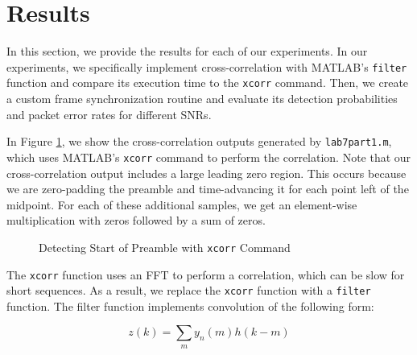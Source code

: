\documentclass{article}
\begin{document}
\section{Results}

In this section, we provide the results for each of our experiments. In our experiments, we specifically implement cross-correlation with MATLAB's \texttt{filter} function and compare its execution time to the \texttt{xcorr} command. Then, we create a custom frame synchronization routine and evaluate its detection probabilities and packet error rates for different SNRs.

In Figure \ref{fig::xcorr_preamble_detect}, we show the cross-correlation outputs generated by \texttt{lab7part1.m}, which uses MATLAB's \texttt{xcorr} command to perform the correlation. Note that our cross-correlation output includes a large leading zero region. This occurs because we are zero-padding the preamble and time-advancing it for each point left of the midpoint. For each of these additional samples, we get an element-wise multiplication with zeros followed by a sum of zeros.

\begin{figure}[H]
	\centerline{}
	\caption{Detecting Start of Preamble with \texttt{xcorr} Command}
	\label{fig::xcorr_preamble_detect}
\end{figure}

The \texttt{xcorr} function uses an FFT to perform a correlation, which can be slow for short sequences. As a result, we replace the \texttt{xcorr} function with a \texttt{filter} function. The filter function implements convolution of the following form:

\begin{equation}
	z(k) = \sum_{m}{y_n(m)h(k - m)}
\end{equation}
\end{document}
